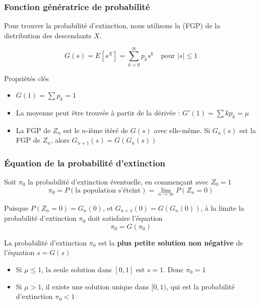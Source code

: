 \documentclass[aspectratio=169]{beamer}\usepackage[]{graphicx}\usepackage[]{xcolor}
\begin{document}
\begin{frame}
    \frametitle{Fonction génératrice de probabilité}

    Pour trouver la probabilité d'extinction, nous utilisons la  (FGP) de la distribution des descendants $X$.

    $$ G(s) = E[s^X] = \sum_{k=0}^{\infty} p_k s^k \quad \text{pour } |s| \le 1 $$

    \begin{block}{Propriétés clés}
    \begin{itemize}
        \item $G(1) = \sum p_k = 1$
        \item La moyenne peut être trouvée à partir de la dérivée : $G'(1) = \sum k p_k = \mu$
        \item La FGP de $Z_n$ est le $n$-ième itéré de $G(s)$ avec elle-même. Si $G_n(s)$ est la FGP de $Z_n$, alors $G_{n+1}(s) = G(G_n(s))$
    \end{itemize}
    \end{block}

\end{frame}

\begin{frame}
    \frametitle{Équation de la probabilité d'extinction}
    Soit $\pi_0$ la probabilité d'extinction éventuelle, en commençant avec $Z_0=1$
    $$ \pi_0 = P(\text{la population s'éteint}) = \lim_{n \to \infty} P(Z_n = 0) $$

    Puisque $P(Z_n=0) = G_n(0)$, et $G_{n+1}(0) = G(G_n(0))$, à la limite la probabilité d'extinction $\pi_0$ doit satisfaire l'équation 
\[
\pi_0 = G(\pi_0)
\]

    \begin{theorem}
    La probabilité d'extinction $\pi_0$ est la \textbf{plus petite solution non négative} de l'équation $s = G(s)$
    \end{theorem}

    \begin{itemize}
        \item Si $\mu \le 1$, la seule solution dans $[0,1]$ est $s=1$. Donc $\pi_0=1$
        \item Si $\mu > 1$, il existe une solution unique dans $[0,1)$, qui est la probabilité d'extinction $\pi_0 < 1$
    \end{itemize}
\end{frame}
\end{document}
